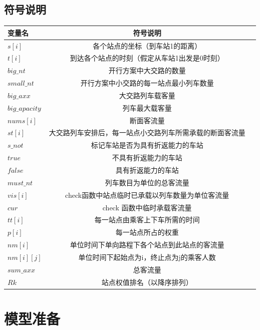 \documentclass[UTF8]{ctexart}
\begin{document}
\subsection{符号说明}
\begin{table}[htbp]
	\centering 
	\begin{tabular}{lcr}
		\toprule
		变量名 & 符号说明  \\
		\midrule
		$s\left[ i \right] $ &各个站点的坐标（到车站1的距离） \\
		$t\left[ i \right] $ & 到达各个站点的时刻（假定从车站1出发是0时刻）  \\
		$big\_nt$ & 开行方案中大交路的数量  \\
		$small\_nt$ & 开行方案中小交路的每一站点最小列车数量 \\
		$big\_axx$& 大交路列车载客量  \\
		$big\_apacity$& 列车最大载客量  \\
		$nums\left[ i \right] $& 断面客流量 \\
		$st\left[ i \right] $& 大交路列车安排后，每一站点小交路列车所需承载的断面客流量 \\
		$s\_not$& 标记车站是否为具有折返能力的车站  \\
		$true$& 不具有折返能力的车站  \\
		$false$& 具有折返能力的车站  \\
		$must\_nt$& 列车数目为单位的总客流量  \\
		$vis\left[ i \right] $& check函数中站点临时已承载以列车数量为单位客流量  \\
		$cur$& check 函数中临时承载客流量  \\
		$tt\left[ i \right] $& 每一站点由乘客上下车所需的时间  \\
		$p\left[ i \right] $& 每一站点所占的权重  \\
		$nm\left[ i \right] $& 单位时间下单向路程下各个站点到此站点的客流量  \\
		$nm\left[ i \right] \left[ j \right] $& 单位时间下起始点为i，终止点为j的乘客人数  \\
		$sum\_axx$& 总客流量  \\
		$Rk$& 站点权值排名（以降序排列） \\
		\bottomrule
	\end{tabular}
\end{table}
\section{模型准备}
\end{document}
